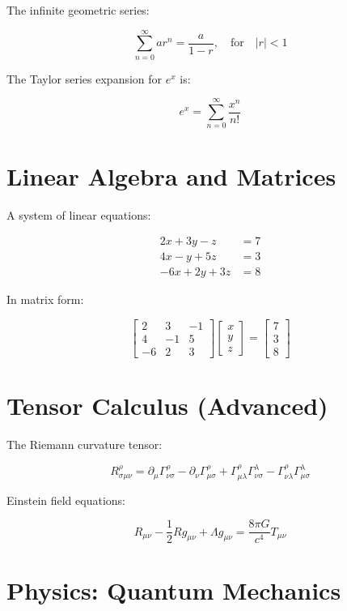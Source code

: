 \documentclass{article}
\begin{document}
The infinite geometric series:

\[
\sum_{n=0}^{\infty} ar^n = \frac{a}{1-r}, \quad \text{for} \quad |r| < 1
\]

The Taylor series expansion for \( e^x \) is:

\[
e^x = \sum_{n=0}^{\infty} \frac{x^n}{n!}
\]

\section{Linear Algebra and Matrices}

A system of linear equations:

\[
\begin{aligned}
2x + 3y - z &= 7 \\
4x - y + 5z &= 3 \\
-6x + 2y + 3z &= 8
\end{aligned}
\]

In matrix form:

\[
\begin{bmatrix}
2 & 3 & -1 \\
4 & -1 & 5 \\
-6 & 2 & 3
\end{bmatrix}
\begin{bmatrix}
x \\ y \\ z
\end{bmatrix}
=
\begin{bmatrix}
7 \\ 3 \\ 8
\end{bmatrix}
\]

\section{Tensor Calculus (Advanced)}

The Riemann curvature tensor:

\[
R^\rho_{\sigma\mu\nu} = \partial_\mu \Gamma^\rho_{\nu\sigma} - \partial_\nu \Gamma^\rho_{\mu\sigma} + \Gamma^\rho_{\mu\lambda} \Gamma^\lambda_{\nu\sigma} - \Gamma^\rho_{\nu\lambda} \Gamma^\lambda_{\mu\sigma}
\]

Einstein field equations:

\[
R_{\mu\nu} - \frac{1}{2} R g_{\mu\nu} + \Lambda g_{\mu\nu} = \frac{8\pi G}{c^4} T_{\mu\nu}
\]

\section{Physics: Quantum Mechanics}
\end{document}
